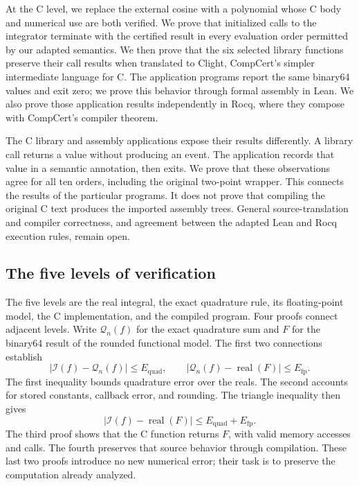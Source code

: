 \documentclass[11pt]{article}
\newcommand{\real}{\operatorname{real}}
\newcommand{\I}{\mathcal{I}}
\newcommand{\Q}{\mathcal{Q}}
\begin{document}
At the C level, we replace the external cosine with a polynomial whose C
body and numerical use are both verified. We prove that initialized calls
to the integrator terminate with the certified result in every evaluation
order permitted by our adapted semantics. We then prove that the six
selected library functions preserve their call results when translated to
Clight, CompCert's simpler intermediate language for C. The application
programs report the same binary64 values and exit zero; we prove this
behavior through formal assembly in Lean. We also prove those application
results independently in Rocq, where they compose with CompCert's compiler
theorem.

The C library and assembly applications expose their results differently.
A library call returns a value without producing an event. The application
records that value in a semantic annotation, then exits. We prove that these
observations agree for all ten orders, including the original two-point
wrapper. This connects the results of the particular programs. It does not
prove that compiling the original C text produces the imported assembly
trees. General source-translation and compiler correctness, and agreement
between the adapted Lean and Rocq execution rules, remain open.

\subsection{The five levels of verification}
\label{sec:levels}

The five levels are the real integral, the exact quadrature rule, its
floating-point model, the C implementation, and the compiled program.
Four proofs connect adjacent levels. Write $\Q_n(f)$ for the exact
quadrature sum and $F$ for the binary64 result of the rounded functional
model. The first two connections establish
\begin{equation}
 |\I(f)-\Q_n(f)|\le E_{\mathrm{quad}},
 \qquad
 |\Q_n(f)-\real(F)|\le E_{\mathrm{fp}}.
 \label{eq:two-errors}
\end{equation}
The first inequality bounds quadrature error over the reals. The second
accounts for stored constants, callback error, and rounding. The triangle
inequality then gives
\[
  |\I(f)-\real(F)|\le E_{\mathrm{quad}}+E_{\mathrm{fp}}.
\]
The third proof shows that the C function returns $F$, with valid memory
accesses and calls. The fourth preserves that source behavior through
compilation. These last two proofs introduce no new numerical error; their
task is to preserve the computation already analyzed.
\end{document}
